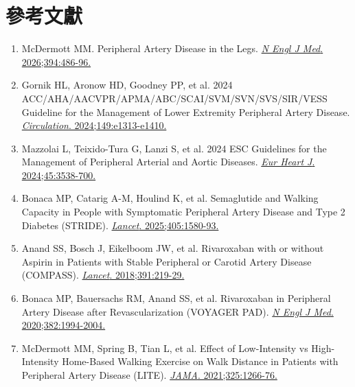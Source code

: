 \documentclass[12pt,a4paper]{article}
\begin{document}
\section{參考文獻}

\begin{enumerate}
    \item McDermott MM. Peripheral Artery Disease in the Legs. \href{https://doi.org/10.1056/NEJMcp2501200}{\textit{N Engl J Med}. 2026;394:486-96.}

    \item Gornik HL, Aronow HD, Goodney PP, et al. 2024 ACC/AHA/AACVPR/APMA/ABC/SCAI/SVM/SVN/SVS/SIR/VESS Guideline for the Management of Lower Extremity Peripheral Artery Disease. \href{https://doi.org/10.1161/CIR.0000000000001251}{\textit{Circulation}. 2024;149:e1313-e1410.}

    \item Mazzolai L, Teixido-Tura G, Lanzi S, et al. 2024 ESC Guidelines for the Management of Peripheral Arterial and Aortic Diseases. \href{https://doi.org/10.1093/eurheartj/ehae179}{\textit{Eur Heart J}. 2024;45:3538-700.}

    \item Bonaca MP, Catarig A-M, Houlind K, et al. Semaglutide and Walking Capacity in People with Symptomatic Peripheral Artery Disease and Type 2 Diabetes (STRIDE). \href{https://doi.org/10.1016/S0140-6736(25)00565-9}{\textit{Lancet}. 2025;405:1580-93.}

    \item Anand SS, Bosch J, Eikelboom JW, et al. Rivaroxaban with or without Aspirin in Patients with Stable Peripheral or Carotid Artery Disease (COMPASS). \href{https://doi.org/10.1016/S0140-6736(17)32409-1}{\textit{Lancet}. 2018;391:219-29.}

    \item Bonaca MP, Bauersachs RM, Anand SS, et al. Rivaroxaban in Peripheral Artery Disease after Revascularization (VOYAGER PAD). \href{https://doi.org/10.1056/NEJMoa1910459}{\textit{N Engl J Med}. 2020;382:1994-2004.}

    \item McDermott MM, Spring B, Tian L, et al. Effect of Low-Intensity vs High-Intensity Home-Based Walking Exercise on Walk Distance in Patients with Peripheral Artery Disease (LITE). \href{https://doi.org/10.1001/jama.2021.2536}{\textit{JAMA}. 2021;325:1266-76.}
\end{enumerate}
\end{document}
